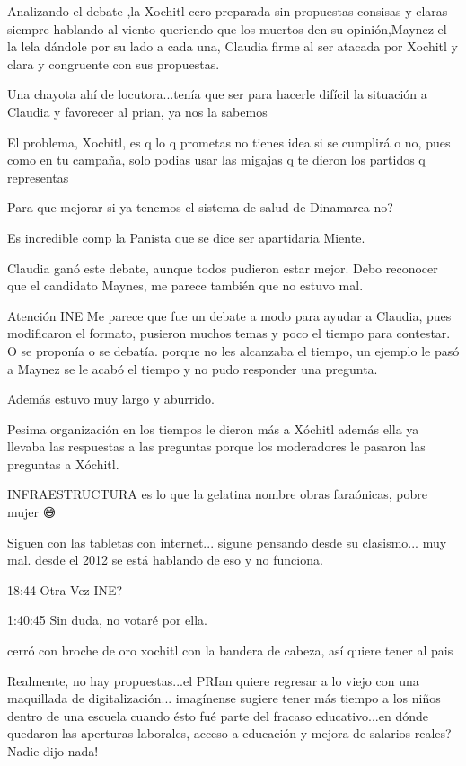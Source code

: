 Analizando el debate ,la Xochitl cero preparada sin propuestas consisas y claras siempre hablando al viento queriendo que los muertos den su opinión,Maynez el la lela dándole por su lado a cada una, Claudia firme al ser atacada por Xochitl y clara y congruente con sus propuestas.

Una chayota ahí de locutora...tenía que ser para hacerle difícil la situación a Claudia y favorecer al prian, ya nos la sabemos

El problema, Xochitl, es q lo q prometas no tienes idea si se cumplirá o no, pues como en tu campaña, solo podias usar las migajas q te dieron los partidos q representas

Para que mejorar si ya tenemos el sistema de salud de Dinamarca no? 🤨

Es incredible comp la Panista que se dice ser apartidaria Miente.

Claudia ganó este debate, aunque todos pudieron estar mejor. Debo reconocer que el candidato Maynes, me parece también que no estuvo mal.

Atención INE 
Me parece que fue un debate a modo para ayudar a Claudia, pues modificaron el formato,  pusieron muchos temas y poco el tiempo para contestar. O se  proponía o se debatía. porque no les alcanzaba el tiempo, un ejemplo le pasó a Maynez se le acabó el tiempo y no pudo responder una pregunta.

Además estuvo muy largo y aburrido.

Pesima organización en los tiempos le dieron más a Xóchitl además ella ya llevaba las respuestas a las preguntas porque los moderadores le pasaron las preguntas a Xóchitl.

INFRAESTRUCTURA es lo que la gelatina nombre obras faraónicas, pobre mujer 😅

Siguen con las tabletas con internet... sigune pensando desde su clasismo... muy mal. desde el 2012 se está hablando de eso y no funciona.

18:44 Otra Vez INE?

1:40:45 Sin duda, no votaré por ella.

cerró con broche de oro xochitl con la bandera de cabeza, así quiere tener al pais

Realmente, no hay propuestas...el PRIan quiere regresar a lo viejo con una maquillada de digitalización... imagínense sugiere tener más tiempo a los niños dentro de una escuela cuando ésto fué parte del fracaso educativo...en dónde quedaron las aperturas laborales, acceso a educación y mejora de salarios reales? Nadie dijo nada!

